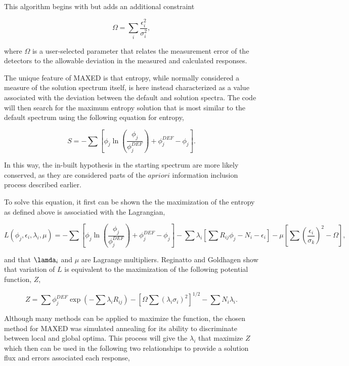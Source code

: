 This algorithm begins with  but adds an additional constraint

\begin{equation}\label{eqn:maxed-omega}
\Omega = \sum_i \frac{\epsilon_i^2}{\sigma_i^2} ,
\end{equation}

where $\Omega$ is a user-selected parameter that relates the measurement error of the detectors to the allowable deviation in the measured and calculated responses.

The unique feature of MAXED is that entropy, while normally considered a measure of the solution spectrum itself, is here instead characterized as a value associated with the deviation between the default and solution spectra.
The code will then search for the maximum entropy solution that is most similar to the default spectrum using the following equation for entropy,

\begin{equation}\label{eqn:maxed-skilling}
S = - \sum [\phi_j \ln (\frac{\phi_j}{\phi_j^{DEF}}) + \phi_j^{DEF} - \phi_j] .
\end{equation}

In this way, the in-built hypothesis in the starting spectrum are more likely conserved, as they are considered parts of the $a priori$ information inclusion process described earlier.

To solve this equation, it first can be shown the the maximization of the entropy as defined above is associatied with the Lagrangian,

\begin{equation}\label{eqn:maxed-lagrangian}
L(\phi_j, \epsilon_i, \lambda_i, \mu) = -\sum [\phi_j \ln (\frac{\phi_j}{\phi_j^{DEF}}) + \phi_j^{DEF} - \phi_j] - \sum \lambda_i [\sum R_{ij} \phi_j - N_i - \epsilon_i] - \mu [\sum (\frac{\epsilon_i}{\sigma_k})^2 - \Omega] ,
\end{equation}

and that $\lamda_i$ and $\mu$ are Lagrange multipliers.
Reginatto and Goldhagen show that variation of $L$ is equivalent to the maximization of the following potential function, $Z$,

\begin{equation}\label{eqn:maxed-potential}
Z = \sum \phi_j^{DEF} \exp(-\sum \lambda_i R_{ij}) - [\Omega \sum (\lambda_i \sigma_i)^2]^{1/2} - \sum N_i \lambda_i .
\end{equation}

Although many methods can be applied to maximize the function, the chosen method for MAXED was simulated annealing for its ability to discriminate between local and global optima.
This process will give the $\lambda_i$ that maximize $Z$ which then can be used in the following two relationships to provide a solution flux and errors associated each response,

